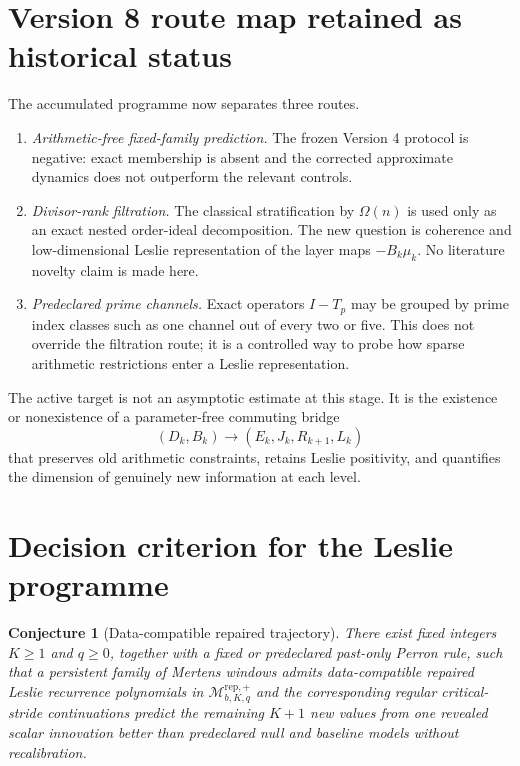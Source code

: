 \documentclass[11pt]{amsart}
\numberwithin{equation}{section}
\theoremstyle{plain}
\newtheorem{conjecture}[theorem]{Conjecture}
\theoremstyle{definition}
\theoremstyle{remark}
\begin{document}
\section{Version 8 route map retained as historical status}
\label{sec:v8_route_map}

The accumulated programme now separates three routes.

\begin{enumerate}
\item[\texttt{[CLOSED]}]
\emph{Arithmetic-free fixed-family prediction.}
The frozen Version 4 protocol is negative: exact membership is absent and the corrected
approximate dynamics does not outperform the relevant controls.

\item[\texttt{[ADAPT]}]
\emph{Divisor-rank filtration.}
The classical stratification by $\Omega(n)$ is used only as an exact nested order-ideal
decomposition.  The new question is coherence and low-dimensional Leslie representation of the
layer maps $-B_k\mu_k$.  No literature novelty claim is made here.

\item[\texttt{[SIDE]}]
\emph{Predeclared prime channels.}
Exact operators $I-T_p$ may be grouped by prime index classes such as one channel out of every
two or five.  This does not override the filtration route; it is a controlled way to probe how
sparse arithmetic restrictions enter a Leslie representation.
\end{enumerate}

The active target is not an asymptotic estimate at this stage.  It is the existence or
nonexistence of a parameter-free commuting bridge
\[
(D_k,B_k)
\longrightarrow
(E_k,J_k,R_{k+1},L_k)
\]
that preserves old arithmetic constraints, retains Leslie positivity, and quantifies the
dimension of genuinely new information at each level.


\section{Decision criterion for the Leslie programme}
\label{sec:decision_criterion}

\begin{conjecture}[Data-compatible repaired trajectory]
\label{conj:transportable_trajectory_v7}
There exist fixed integers $K\geq1$ and $q\geq0$, together with a fixed or predeclared past-only Perron rule, such that a persistent family of Mertens windows admits data-compatible repaired Leslie recurrence polynomials in $\mathcal M^{\mathrm{rep},+}_{b,K,q}$ and the corresponding regular critical-stride continuations predict the remaining $K+1$ new values from one revealed scalar innovation better than predeclared null and baseline models without recalibration.
\end{conjecture}
\end{document}
